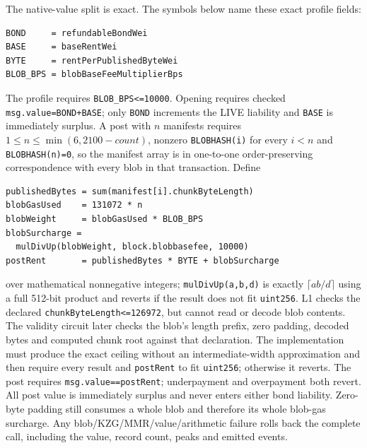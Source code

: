 \documentclass[a4paper,11pt]{article}
\newcommand{\code}[1]{\nolinkurl{#1}}
\begin{document}
The native-value split is exact.  The symbols below name these exact profile
fields:
\begin{verbatim}
BOND     = refundableBondWei
BASE     = baseRentWei
BYTE     = rentPerPublishedByteWei
BLOB_BPS = blobBaseFeeMultiplierBps
\end{verbatim}
The profile requires
\code{BLOB\_BPS<=10000}.  Opening requires checked
\code{msg.value=BOND+BASE}; only \code{BOND} increments the LIVE liability and
\code{BASE} is immediately surplus.  A post with $n$ manifests requires
$1\le n\le\min(6,2100-count)$, nonzero \code{BLOBHASH(i)} for every $i<n$ and
\code{BLOBHASH(n)=0}, so the manifest array is in one-to-one order-preserving
correspondence with every blob in that transaction.  Define
\begin{verbatim}
publishedBytes = sum(manifest[i].chunkByteLength)
blobGasUsed    = 131072 * n
blobWeight     = blobGasUsed * BLOB_BPS
blobSurcharge =
  mulDivUp(blobWeight, block.blobbasefee, 10000)
postRent       = publishedBytes * BYTE + blobSurcharge
\end{verbatim}
over mathematical nonnegative integers; \code{mulDivUp(a,b,d)} is exactly
$\lceil ab/d\rceil$ using a full 512-bit product and reverts if the result does
not fit \code{uint256}.  L1 checks the declared
\code{chunkByteLength<=126972}, but cannot read or decode blob contents.  The
validity circuit later checks the blob's length prefix, zero padding, decoded
bytes and computed chunk root against that declaration.  The implementation
must produce the exact ceiling
without an intermediate-width approximation and then require every result and
\code{postRent} to fit \code{uint256}; otherwise it reverts.  The post requires
\code{msg.value==postRent}; underpayment and overpayment both revert.  All post
value is immediately surplus and never enters either bond liability.  Zero-byte
padding still consumes a whole blob and therefore its whole blob-gas surcharge.
Any blob/KZG/MMR/value/arithmetic failure rolls back the complete call, including
the value, record count, peaks and emitted events.
\end{document}
